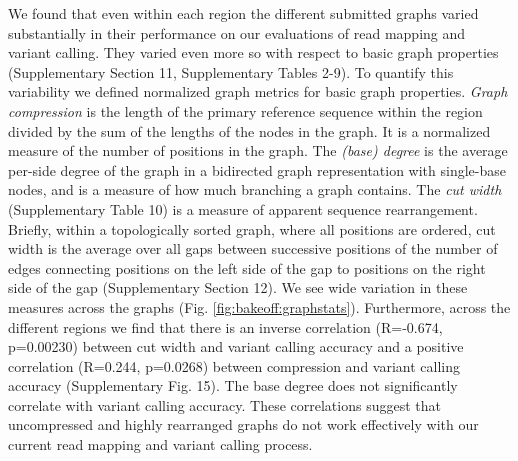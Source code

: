 We found that even within each region the different submitted graphs
varied substantially in their performance on our evaluations of read
mapping and variant calling. They varied even more so with respect to
basic graph properties (Supplementary Section 11, Supplementary Tables
2-9). To quantify this variability we defined normalized graph metrics
for basic graph properties. \emph{Graph compression} is the length of
the primary reference sequence within the region divided by the sum of
the lengths of the nodes in the graph. It is a normalized measure of the
number of positions in the graph. The \emph{(base) degree} is the average
per-side degree of the graph in a bidirected graph representation with
single-base nodes, and is a measure of how much branching a graph
contains. The \emph{cut width} (Supplementary Table 10) is a measure of
apparent sequence rearrangement. Briefly, within a topologically sorted
graph, where all positions are ordered, cut width is the average over
all gaps between successive positions of the number of edges connecting
positions on the left side of the gap to positions on the right side of
the gap (Supplementary Section 12)\cite{haussler2017flow}. We see
wide variation in these measures across the graphs (Fig. \ref{fig:bakeoff:graphstats}).
Furthermore, across the different regions we find that there is an
inverse correlation (R=-0.674, p=0.00230) between cut width and variant
calling accuracy and a positive correlation (R=0.244, p=0.0268) between
compression and variant calling accuracy (Supplementary Fig. 15). The
base degree does not significantly correlate with variant calling
accuracy. These correlations suggest that uncompressed and highly
rearranged graphs do not work effectively with our current read mapping
and variant calling process.

